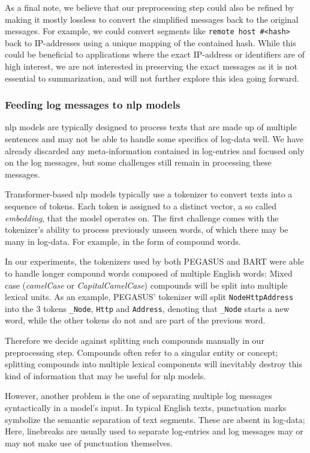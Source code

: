 As a final note, we believe that our preprocessing step could also be refined by making it mostly lossless
to convert the simplified messages back to the original messages.
For example, we could convert segments like \verb+remote host #<hash>+ back to IP-addresses using a unique mapping of the contained hash.
While this could be beneficial to applications where the exact IP-address or identifiers are of high interest,
we are not interested in preserving the exact messages as it is not essential to summarization,
and will not further explore this idea going forward.

\subsubsection{Feeding log messages to \ac{nlp} models}\label{subsubsec:model_input_challenges}

\ac{nlp} models are typically designed to process texts that are made up of multiple sentences
and may not be able to handle some specifics of log-data well.
We have already discarded any meta-information contained in log-entries and focused only on the log messages,
but some challenges still remain in processing these messages.

Transformer-based \ac{nlp} models typically use a tokenizer to convert texts into a sequence of tokens.
Each token is assigned to a distinct vector, a so called \emph{embedding}, that the model operates on.
The first challenge comes with the tokenizer's ability to process previously unseen words,
of which there may be many in log-data. For example, in the form of compound words.

In our experiments, the tokenizers used by both PEGASUS and BART were able to handle longer compound words composed of multiple English words:
Mixed case (\emph{camelCase} or \emph{CapitalCamelCase}) compounds will be split into multiple lexical units.
As an example, PEGASUS' tokenizer will split \verb+NodeHttpAddress+ into the 3 tokens \verb+_Node+, \verb+Http+ and \verb+Address+,
denoting that \verb+_Node+ starts a new word, while the other tokens do not and are part of the previous word.

Therefore we decide against splitting such compounds manually in our preprocessing step.
Compounds often refer to a singular entity or concept;
splitting compounds into multiple lexical components will inevitably destroy this kind of information that may be useful for \ac{nlp} models.

However, another problem is the one of separating multiple log messages syntactically in a model's input.
In typical English texts, punctuation marks symbolize the semantic separation of text segments.
These are absent in log-data; Here, linebreaks are usually used to separate log-entries
and log messages may or may not make use of punctuation themselves.

